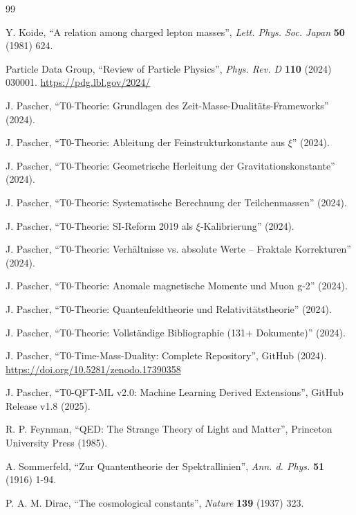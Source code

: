 	\begin{thebibliography}{99}
		
		Y. Koide, ``A relation among charged lepton masses'', \textit{Lett. Phys. Soc. Japan} \textbf{50} (1981) 624.
		
		Particle Data Group, ``Review of Particle Physics'', \textit{Phys. Rev. D} \textbf{110} (2024) 030001. 
		\url{https://pdg.lbl.gov/2024/}
		
		J. Pascher, ``T0-Theorie: Grundlagen des Zeit-Masse-Dualitäts-Frameworks'' (2024).
		
		J. Pascher, ``T0-Theorie: Ableitung der Feinstrukturkonstante aus $\xi$'' (2024).
		
		J. Pascher, ``T0-Theorie: Geometrische Herleitung der Gravitationskonstante'' (2024).
		
		J. Pascher, ``T0-Theorie: Systematische Berechnung der Teilchenmassen'' (2024).
		
		J. Pascher, ``T0-Theorie: SI-Reform 2019 als $\xi$-Kalibrierung'' (2024).
		
		J. Pascher, ``T0-Theorie: Verhältnisse vs. absolute Werte -- Fraktale Korrekturen'' (2024).
		
		J. Pascher, ``T0-Theorie: Anomale magnetische Momente und Muon g-2'' (2024).
		
		J. Pascher, ``T0-Theorie: Quantenfeldtheorie und Relativitätstheorie'' (2024).
		
		J. Pascher, ``T0-Theorie: Vollständige Bibliographie (131+ Dokumente)'' (2024).
		
		J. Pascher, ``T0-Time-Mass-Duality: Complete Repository'', GitHub (2024). 
		\url{https://doi.org/10.5281/zenodo.17390358}
		
		J. Pascher, ``T0-QFT-ML v2.0: Machine Learning Derived Extensions'', GitHub Release v1.8 (2025).
		
		R. P. Feynman, ``QED: The Strange Theory of Light and Matter'', Princeton University Press (1985).
		
		A. Sommerfeld, ``Zur Quantentheorie der Spektrallinien'', \textit{Ann. d. Phys.} \textbf{51} (1916) 1-94.
		
		P. A. M. Dirac, ``The cosmological constants'', \textit{Nature} \textbf{139} (1937) 323.
		

\end{thebibliography}
